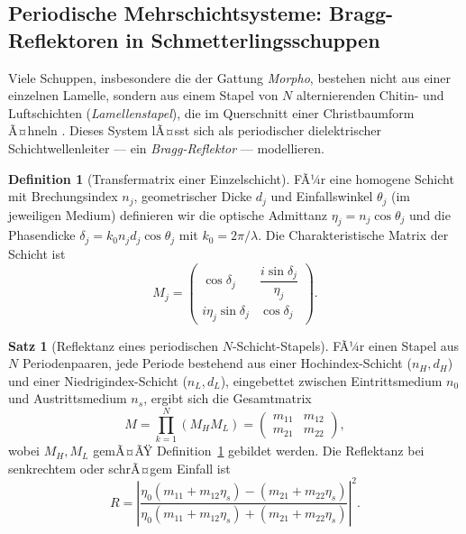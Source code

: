 ﻿\documentclass[a4paper,12pt]{article}
\theoremstyle{definition}
\newtheorem{definition}{Definition}
\newtheorem{satz}{Satz}
\begin{document}
\subsection{Periodische Mehrschichtsysteme: Bragg-Reflektoren in Schmetterlingsschuppen}
\label{sec:bragg}

Viele Schuppen, insbesondere die der Gattung \textit{Morpho}, bestehen nicht
aus einer einzelnen Lamelle, sondern aus einem Stapel von $N$ alternierenden
Chitin- und Luftschichten (\textit{Lamellenstapel}), die im
Querschnitt einer Christbaumform Ã¤hneln \cite{vukusic2003photonic}.
Dieses System lÃ¤sst sich als periodischer dielektrischer
Schichtwellenleiter --- ein \emph{Bragg-Reflektor} --- modellieren.

\begin{definition}[Transfermatrix einer Einzelschicht]
	\label{def:transfermatrix}
	FÃ¼r eine homogene Schicht mit Brechungsindex $n_j$, geometrischer Dicke
	$d_j$ und Einfallswinkel $\theta_j$ (im jeweiligen Medium) definieren wir
	die optische Admittanz $\eta_j = n_j \cos\theta_j$ und die
	Phasendicke $\delta_j = k_0 n_j d_j \cos\theta_j$ mit
	$k_0 = 2\pi/\lambda$. Die Charakteristische Matrix der Schicht ist
	\[
	M_j = \begin{pmatrix}
		\cos\delta_j & \dfrac{i \sin\delta_j}{\eta_j}\\[1.2ex]
		i \eta_j \sin\delta_j & \cos\delta_j
	\end{pmatrix}.
	\]
\end{definition}

\begin{satz}[Reflektanz eines periodischen $N$-Schicht-Stapels]
	\label{satz:bragg}
	FÃ¼r einen Stapel aus $N$ Periodenpaaren, jede Periode bestehend aus
	einer Hochindex-Schicht ($n_H, d_H$) und einer Niedrigindex-Schicht
	($n_L, d_L$), eingebettet zwischen Eintrittsmedium $n_0$ und
	Austrittsmedium $n_s$, ergibt sich die Gesamtmatrix
	\[
	M = \prod_{k=1}^{N} \left(M_H M_L\right) =
	\begin{pmatrix} m_{11} & m_{12}\\ m_{21} & m_{22}\end{pmatrix},
	\]
	wobei $M_H, M_L$ gemÃ¤ÃŸ Definition~\ref{def:transfermatrix} gebildet
	werden. Die Reflektanz bei senkrechtem oder schrÃ¤gem Einfall ist
	\[
	R = \left|\frac{\eta_0(m_{11}+m_{12}\eta_s) - (m_{21}+m_{22}\eta_s)}
	{\eta_0(m_{11}+m_{12}\eta_s) + (m_{21}+m_{22}\eta_s)}\right|^2.
	\]
\end{satz}
\end{document}
